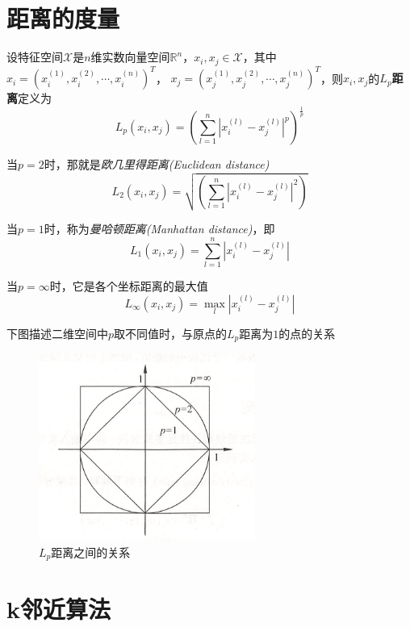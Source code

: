 \section{距离的度量}

设特征空间$\mathcal{X}$是$n$维实数向量空间$\mathbb{R}^n$，$x_i,x_j\in \mathcal{X}$，其中$x_i=(x^{(1)}_i,x^{(2)}_i,\cdots,x^{(n)}_i)^T$，
$x_j=(x^{(1)}_j,x^{(2)}_j,\cdots,x^{(n)}_j)^T$，则$x_i,x_j$的\textbf{$L_p$距离}定义为
\begin{equation}
    L_p(x_i,x_j)=\left(\sum_{l=1}^{n}|x^{(l)}_i-x^{(l)}_j|^p\right)^{\frac{1}{p}}
\end{equation}

当$p=2$时，那就是\textsl{欧几里得距离(Euclidean distance)}
\begin{equation}
    L_2(x_i,x_j)=\sqrt{\left(\sum_{l=1}^{n}|x^{(l)}_i-x^{(l)}_j|^2\right)}
\end{equation}

当$p=1$时，称为\textsl{曼哈顿距离(Manhattan distance)}，即
\begin{equation}
    L_1(x_i,x_j)=\sum_{l=1}^{n}|x^{(l)}_i-x^{(l)}_j|
\end{equation}

当$p=\infty$时，它是各个坐标距离的最大值
\begin{equation}
    L_{\infty}(x_i,x_j)=\max\limits_{l} |x^{(l)}_i-x^{(l)}_j|
\end{equation}

下图描述二维空间中$p$取不同值时，与原点的$L_p$距离为$1$的点的关系
\begin{figure}[H]
    \centering
    \includegraphics[scale=0.7]{figures/LP距离之间的关系.png}
    \caption{$L_p$距离之间的关系}
\end{figure}

\section{k邻近算法}

